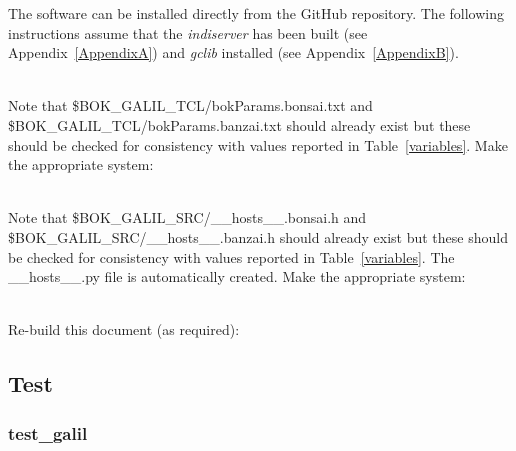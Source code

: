 \documentclass[12pt,twoside]{article}
\begin{document}
\noindent The software can be installed directly from the GitHub repository. The following instructions assume that
the \emph{indiserver} has been built (see Appendix~\ref{AppendixA}) and \emph{gclib} installed (see Appendix~\ref{AppendixB}). \\







 \\

\noindent Note that \$BOK\_GALIL\_TCL/bokParams.bonsai.txt and \$BOK\_GALIL\_TCL/bokParams.banzai.txt should already exist 
but these should be checked for consistency with values reported in Table~\ref{variables}. Make the appropriate system: \\


 \\

\noindent Note that \$BOK\_GALIL\_SRC/\_\_hosts\_\_.bonsai.h and \$BOK\_GALIL\_SRC/\_\_hosts\_\_.banzai.h should already exist 
but these should be checked for consistency with values reported in Table~\ref{variables}. The \_\_hosts\_\_.py file is 
automatically created. Make the appropriate system: \\


 \\

\noindent Re-build this document (as required): \\



\subsection{Test}
\label{tests}

\subsubsection{test\_galil}
\end{document}
